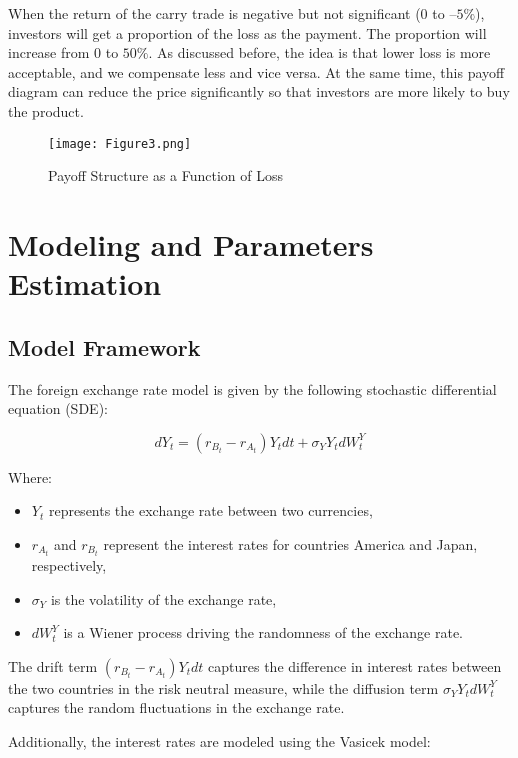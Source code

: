 \documentclass[a4paper, twocolumn]{article}
\begin{document}
When the return of the carry trade is negative but not significant (\(0\) to \(–5\%\)), investors will get a proportion of the loss as the payment. The proportion will increase from 0 to \(50\%\). As discussed before, the idea is that lower loss is more acceptable, and we compensate less and vice versa. At the same time, this payoff diagram can reduce the price significantly so that investors are more likely to buy the product.

\begin{figure}[ht]
    \begin{center}
    \texttt{[image: Figure3.png]}
    \caption{Payoff Structure as a Function of Loss}
    \label{fig:picture1}
    \end{center}
\end{figure}

\section{Modeling and Parameters Estimation}

\subsection{Model Framework}

The foreign exchange rate model is given by the following stochastic differential equation (SDE): 

\[
dY_t = (r_{B_t} - r_{A_t})Y_tdt + \sigma_Y Y_t dW^Y_t
\]

Where: 

\begin{itemize}
    \item $Y_t$ represents the exchange rate between two currencies,
    \item $r_{A_t}$ and $r_{B_t}$ represent the interest rates for countries America and Japan, respectively,
    \item $\sigma_Y$ is the volatility of the exchange rate,
    \item $dW^Y_t$ is a Wiener process driving the randomness of the exchange rate.
\end{itemize}

The drift term $(r_{B_t} - r_{A_t})Y_tdt$ captures the difference in interest rates between the two countries in the risk neutral measure, while the diffusion term $\sigma_Y Y_t dW^Y_t$ captures the random fluctuations in the exchange rate. 

Additionally, the interest rates are modeled using the Vasicek model: 
\end{document}
